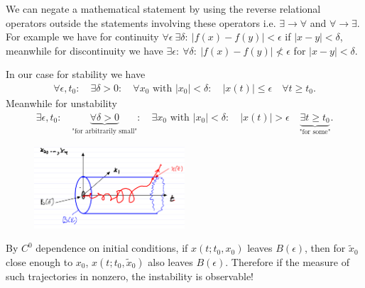 \begin{remark}[]
	We can negate a mathematical statement by using the reverse relational operators outside the statements involving these operators i.e. $ \exists \to \forall $ and $\forall \to \exists $. For example we have for continuity $\forall \epsilon\ \exists \delta:\ |f(x) - f(y)| < \epsilon$ if $|x-y|<\delta$, meanwhile for discontinuity we have  $\exists \epsilon:\ \forall \delta:\ |f(x) - f(y)| \not < \epsilon$ for $|x-y|< \delta$.

	In our case for stability we have
	\begin{align}
		\forall \epsilon,t_0: \quad \exists \delta>0: \quad \forall x_0  \textrm{ with } |x_0| < \delta: \quad |x(t)|\leq \epsilon \quad \forall t\geq t_0.
	\end{align}
Meanwhile for unstability
\begin{align}
	\exists \epsilon,t_0:\quad \underbrace{\forall \delta>0}_{ \textrm{"for arbitrarily small"} }:\quad \exists x_0  \textrm{ with } |x_0|<\delta: \quad |x(t)|>\epsilon \quad \underbrace{\exists t\geq t_0}_{ \textrm{"for some"} }.
\end{align}
\begin{figure}[h]
	\centering
	\includegraphics[width=0.5\textwidth]{figures/ch2/6unstable_def.png}
\end{figure}
\end{remark}

\begin{remark}[]
	By $C^0$ dependence on initial conditions, if $x(t;t_0,x_0)$ leaves $B(\epsilon)$, then for $\tilde{x}_0$ close enough to $x_0$, $x(t;t_0,\tilde{x}_0)$ also leaves $B(\epsilon)$. Therefore if the measure of such trajectories in nonzero, the instability is observable!
\end{remark}

